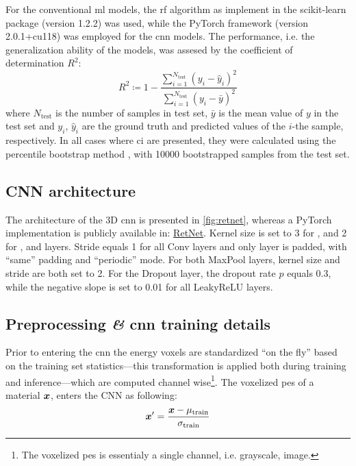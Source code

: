 For the conventional \gls{ml} models, the \gls{rf} algorithm as implement in the
scikit-learn \parencite{sklearn} package (version
1.2.2) was used, while the PyTorch \parencite{pytorch}
framework (version 2.0.1+cu118) was employed for the \gls{cnn} models. The
performance, i.e. the generalization ability of
the models, was assesed by the coefficient of determination $R^2$:
\begin{equation}
	R^2 \coloneqq 1 -
	\frac{
		\sum_{i=1}^{N_\text{test}}
		(y_i - \hat{y}_i)^2
	}{
		\sum_{i=1}^{N_\text{test}}
		(y_i - \bar{y})^2
	}
\end{equation}
where $N_\text{test}$ is the number of samples in test
set, $\bar{y}$ is the mean value of $y$ in the test set and
$y_i$, $\hat{y}_i$ are the ground truth and predicted values of the $i$-the
sample, respectively. In all cases where \gls{ci} are presented, they were
calculated using the percentile bootstrap method \parencite{Efron_1994}, with
\num{10000} bootstrapped samples from the test set.

\subsection{CNN architecture}

The architecture of the 3D \gls{cnn} is presented in \Figure{} \ref{fig:retnet},
whereas a PyTorch implementation is publicly available in:
\href{https://github.com/frudakis-research-group/retnet}{RetNet}.
Kernel size is set to \num{3} for ,  and
\num{2} for ,  and  layers. Stride equals
\num{1} for all Conv layers and only  layer is padded,
with ``same'' padding and ``periodic'' mode. For both MaxPool
layers, kernel size and stride are both set to \num{2}. For
the Dropout layer, the dropout rate $p$
equals \num{0.3}, while the negative slope is set to \num{0.01} for all
LeakyReLU layers.

\subsection{Preprocessing \textit{\&} \acrshort{cnn} training details}
\label{subsec:preprocessing}

Prior to entering the \gls{cnn} the energy voxels are standardized ``on the
fly'' based on the training set statistics---this transformation is applied both
during training and inference---which are computed channel wise\footnote{The
voxelized \gls{pes} is essentialy a single channel, i.e. grayscale,
image.}. The voxelized \gls{pes} of a material $\boldsymbol{x}$,
enters the CNN as following:
\begin{equation}
	\boldsymbol{x}' = \frac{\boldsymbol{x} - \mu_\text{train}}{\sigma_\text{train}}
\end{equation}

